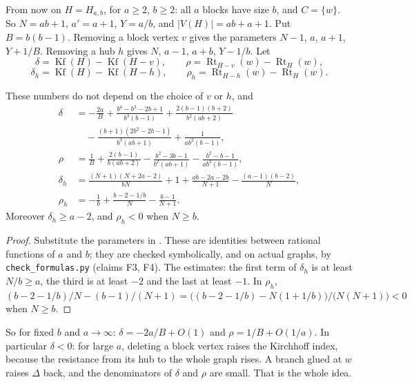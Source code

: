 \documentclass[11pt,a4paper]{report}
\newcommand*{\Kf}{\operatorname{Kf}}
\newcommand*{\Rt}{\operatorname{Rt}}
\begin{document}
From now on \(H=H_{a,b}\), for \(a\ge2\), \(b\ge2\): all \(a\) blocks have size \(b\), and \(C=\{w\}\). So \(N=ab+1\),
\(a'=a+1\), \(Y=a/b\), and \(|V(H)|=ab+a+1\). Put \(B=b(b-1)\). Removing a block vertex \(v\) gives the parameters \(N-1\),
\(a\), \(a+1\), \(Y+1/B\). Removing a hub \(h\) gives \(N\), \(a-1\), \(a+b\), \(Y-1/b\). Let
\[\delta=\Kf(H)-\Kf(H-v),\qquad\rho=\Rt_{H-v}(w)-\Rt_H(w),\]
\[\delta_h=\Kf(H)-\Kf(H-h),\qquad\rho_h=\Rt_{H-h}(w)-\Rt_H(w).\]

\begin{lemma}\label{lem:delta}
These numbers do not depend on the choice of \(v\) or \(h\), and
\begin{align*}
\delta&=-\frac{2a}{B}+\frac{b^4-b^3-2b+1}{b^3(b-1)}+\frac{2(b-1)(b+2)}{b^2(ab+2)}\\
&\quad-\frac{(b+1)(2b^2-2b-1)}{b^3(ab+1)}+\frac1{ab^2(b-1)},\\
\rho&=\frac1{B}+\frac{2(b-1)}{b(ab+2)}-\frac{b^2-3b-1}{b^2(ab+1)}-\frac{b^2-b-1}{ab^2(b-1)},\\
\delta_h&=\frac{(N+1)(N+2a-2)}{bN}+1+\frac{ab-2a-2b}{N+1}-\frac{(a-1)(b-2)}N,\\
\rho_h&=-\frac1b+\frac{b-2-1/b}N-\frac{b-1}{N+1}.
\end{align*}
Moreover \(\delta_h\ge a-2\), and \(\rho_h<0\) when \(N\ge b\).
\end{lemma}
\begin{proof}
Substitute the parameters in . These are identities between rational functions of \(a\) and \(b\); they are
checked symbolically, and on actual graphs, by \texttt{check\_formulas.py} (claims F3, F4). The estimates: the first term of
\(\delta_h\) is at least \(N/b\ge a\), the third is at least \(-2\) and the last at least \(-1\). In \(\rho_h\),
\((b-2-1/b)/N-(b-1)/(N+1)=\bigl((b-2-1/b)-N(1+1/b)\bigr)/\bigl(N(N+1)\bigr)<0\) when \(N\ge b\).
\end{proof}

So for fixed \(b\) and \(a\to\infty\): \(\delta=-2a/B+O(1)\) and \(\rho=1/B+O(1/a)\). In particular \(\delta<0\): for large
\(a\), deleting a block vertex raises the Kirchhoff index, because the resistance from its hub to the whole graph rises. A
branch glued at \(w\) raises \(\Delta\) back, and the denominators of \(\delta\) and \(\rho\) are small. That is the whole
idea.
\end{document}
